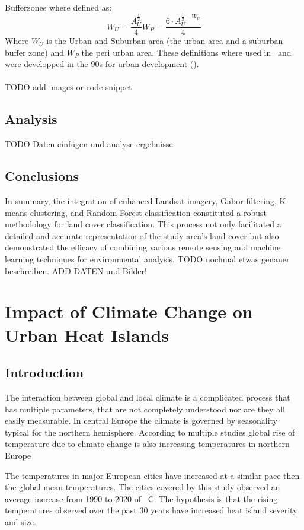 \documentclass[12pt,a4paper, english]{article}
\begin{document}
    Bufferzones where defined as: 
    \begin{equation}
	    W_U = \frac{A_U^{\frac{1}{2}}}{4}
	    W_P = \frac{6\cdot A_U^{\frac{1}{2}-W_U}}{4}
    \end{equation}
    Where $W_U$ is the Urban and Suburban area (the urban area and a suburban buffer zone) and $W_P$ the peri urban area.
    These definitions where used in~\cite{Sobrino2020} and were developped in the 90s for urban development (\cite{AlkanBala2014}).
   \\ 
\\
    TODO add images or code snippet



 \subsection{Analysis}\label{sec:landcoverAnalysis}
TODO Daten einfügen und analyse ergebnisse
  \subsection{Conclusions}
In summary, the integration of enhanced Landsat imagery, Gabor filtering, K-means clustering, and Random Forest classification constituted a robust methodology for land cover classification.
This process not only facilitated a detailed and accurate representation of the study area's land cover but also demonstrated the efficacy of combining various remote sensing and machine learning techniques for environmental analysis.
TODO nochmal etwas genauer beschreiben. ADD DATEN und Bilder! 
%
\newpage
  \section{Impact of Climate Change on Urban Heat Islands}\label{sec:UHITempImp}
    \subsection{Introduction}
    The interaction between global and local climate is a complicated process that has multiple parameters, that are not completely understood nor are they all easily measurable. 
    In central Europe the climate is governed by seasonality typical for the northern hemisphere.  
    According to multiple studies global rise of temperature due to climate change is also increasing temperatures in northern Europe~\cite{Benestad2005}  %

    The temperatures in major European cities have increased at a similar pace then the global mean temperatures. 
    The cities covered by this study observed an average increase from 1990 to 2020 of %
    \textdegree\ C. 
%
    The hypothesis is that the rising temperatures observed over the past 30 years have increased heat island severity and size. 
\end{document}
